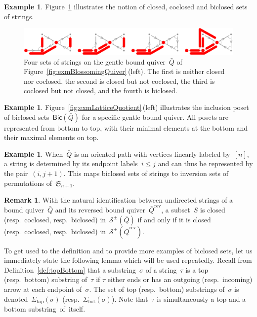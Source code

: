 \documentclass{amsart}
\theoremstyle{definition}
\newtheorem{example}[theorem]{Example}
\newtheorem{remark}[theorem]{Remark}
\newcommand{\fS}{\mathfrak{S}} %
\newcommand{\fref}[1]{Figure~\ref{#1}} %
\newcommand{\strings}{\mathcal{S}} %
\newcommand{\reversed}[1]{#1^{\mathrm{rev}}} %
\renewcommand{\top}{\mathrm{top}} %
\newcommand{\bottom}{\mathrm{bot}} %
\newcommand{\Bicl}[1]{\mathsf{Bic}(#1)} %
\begin{document}
\begin{example}
\fref{fig:exmBiclosed} illustrates the notion of closed, coclosed and biclosed sets of strings.

\begin{figure}[t]
	\capstart
	\centerline{\includegraphics[scale=.45]{exmBiclosed}}
	\caption{Four sets of strings on the gentle bound quiver~$\bar Q$ of \fref{fig:exmBlossomingQuiver}\,(left). The first is neither closed nor coclosed, the second is closed but not coclosed, the third is coclosed but not closed, and the fourth is biclosed.}
	\label{fig:exmBiclosed}
\end{figure}
\end{example}

\begin{example}
\fref{fig:exmLatticeQuotient}\,(left) illustrates the inclusion poset of biclosed sets~$\Bicl{\bar Q}$ for a specific gentle bound quiver.
All posets are represented from bottom to top, with their minimal elements at the bottom and their maximal elements on top.
\end{example}

\begin{example}
When~$\bar Q$ is an oriented path with vertices linearly labeled by~$[n]$, a string is determined by its endpoint labels~$i \le j$ and can thus be represented by the pair~$(i,j+1)$.
This maps biclosed sets of strings to inversion sets of permutations of~$\fS_{n+1}$.
\end{example}

\begin{remark}
\label{rem:reverseBiclosed}
With the natural identification between undirected strings of a bound quiver~$\bar Q$ and its reversed bound quiver~$\reversed{\bar Q}$, a subset~$S$ is closed (resp.~coclosed, resp.~biclosed) in~$\strings^\pm(\bar Q)$ if and only if it is closed (resp.~coclosed, resp.~biclosed) in~$\strings^\pm(\reversed{\bar Q})$.
\end{remark}

\enlargethispage{.3cm}
To get used to the definition and to provide more examples of biclosed sets, let us immediately state the following lemma which will be used repeatedly.
Recall from Definition~\ref{def:topBottom} that a substring~$\sigma$ of a string~$\tau$ is a top (resp.~bottom) substring of~$\tau$ if $\tau$ either ends or has an outgoing (resp.~incoming) arrow at each endpoint of~$\sigma$.
The set of top (resp.~bottom) substrings of~$\sigma$ is denoted~$\Sigma_\top(\sigma)$ (resp.~$\Sigma_\bottom(\sigma)$).
Note that~$\tau$ is simultaneously a top and a bottom \mbox{substring of itself}.
\end{document}
